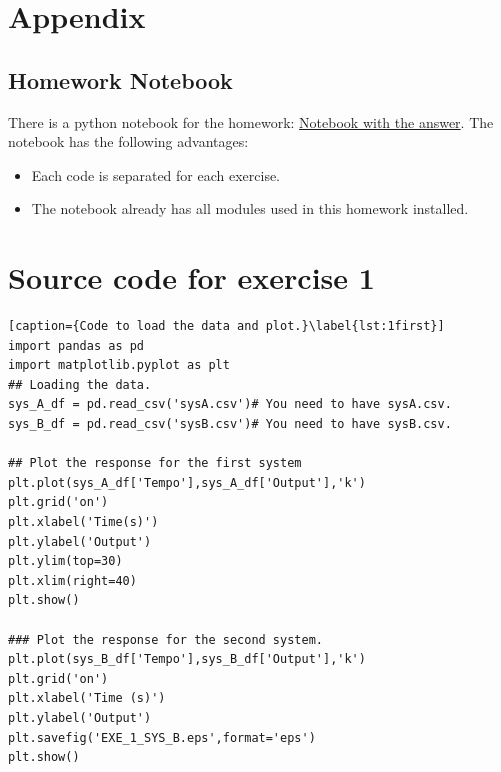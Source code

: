 \documentclass[a4paper]{article}
\begin{document}
\newpage
\section*{Appendix}
\appendix 
\subsection*{Homework Notebook}
\par There is a python notebook for the homework: \href{https://colab.research.google.com/drive/1j09ifwj77xrI9G4FtcCSJtw4kdnd3njG}{Notebook with the answer}. The notebook has the following advantages:
\begin{itemize}
\item Each code is separated for each exercise.
\item The notebook already has all modules used in this homework installed.
\end{itemize}


\section{Source code for exercise 1}

\begin{lstlisting}[caption={Code to load the data and plot.}\label{lst:1first}]
import pandas as pd
import matplotlib.pyplot as plt
## Loading the data.
sys_A_df = pd.read_csv('sysA.csv')# You need to have sysA.csv.
sys_B_df = pd.read_csv('sysB.csv')# You need to have sysB.csv.

## Plot the response for the first system
plt.plot(sys_A_df['Tempo'],sys_A_df['Output'],'k')
plt.grid('on')
plt.xlabel('Time(s)')
plt.ylabel('Output')
plt.ylim(top=30)
plt.xlim(right=40)
plt.show()

### Plot the response for the second system.
plt.plot(sys_B_df['Tempo'],sys_B_df['Output'],'k')
plt.grid('on')
plt.xlabel('Time (s)')
plt.ylabel('Output')
plt.savefig('EXE_1_SYS_B.eps',format='eps')
plt.show()
\end{lstlisting}
\end{document}
